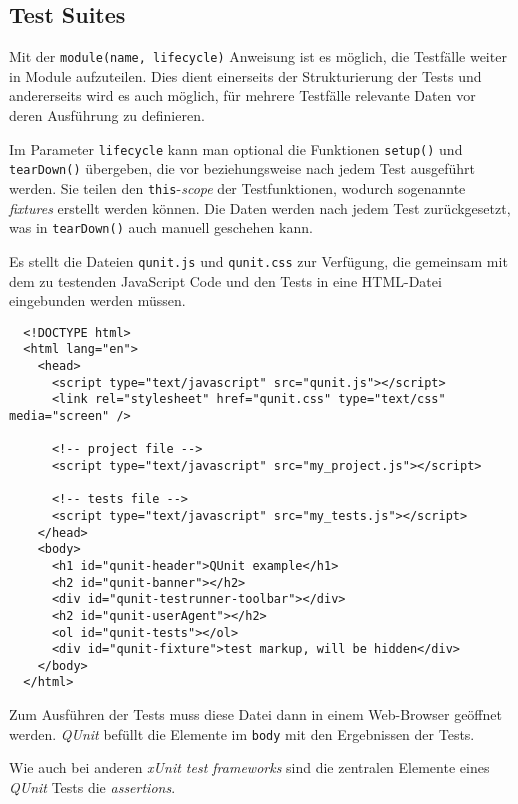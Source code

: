 \documentclass[11pt, a4paper]{article}
\begin{document}
\subsection{Test Suites}

Mit der \texttt{module(name, lifecycle)} Anweisung ist es möglich, die Testfälle
weiter in Module aufzuteilen. Dies dient einerseits der Strukturierung der Tests
und andererseits wird es auch möglich, für mehrere Testfälle relevante Daten vor
deren Ausführung zu definieren.

Im Parameter \texttt{lifecycle} kann man optional die Funktionen
\texttt{setup()} und \texttt{tearDown()} übergeben, die vor beziehungsweise nach
jedem Test ausgeführt werden. Sie teilen den \texttt{this}-\emph{scope} der
Testfunktionen, wodurch sogenannte \emph{fixtures} erstellt werden können. Die
Daten werden nach jedem Test zurückgesetzt, was in \texttt{tearDown()} auch
manuell geschehen kann.

Es stellt die Dateien \texttt{qunit.js} und \texttt{qunit.css} zur Verfügung,
die gemeinsam mit dem zu testenden JavaScript Code und den Tests in eine
HTML-Datei eingebunden werden müssen.

\begin{verbatim}
  <!DOCTYPE html>
  <html lang="en">
    <head>
      <script type="text/javascript" src="qunit.js"></script>
      <link rel="stylesheet" href="qunit.css" type="text/css" media="screen" />

      <!-- project file -->
      <script type="text/javascript" src="my_project.js"></script>

      <!-- tests file -->
      <script type="text/javascript" src="my_tests.js"></script>
    </head>
    <body>
      <h1 id="qunit-header">QUnit example</h1>
      <h2 id="qunit-banner"></h2>
      <div id="qunit-testrunner-toolbar"></div>
      <h2 id="qunit-userAgent"></h2>
      <ol id="qunit-tests"></ol>
      <div id="qunit-fixture">test markup, will be hidden</div>
    </body>
  </html>
\end{verbatim}

Zum Ausführen der Tests muss diese Datei dann in einem Web-Browser geöffnet
werden. \emph{QUnit} befüllt die Elemente im \texttt{body} mit den Ergebnissen
der Tests.

Wie auch bei anderen \emph{xUnit test frameworks} sind die zentralen Elemente
eines \emph{QUnit} Tests die \emph{assertions}.
\begin{flushleft}
  
  
\end{flushleft}
\end{document}
